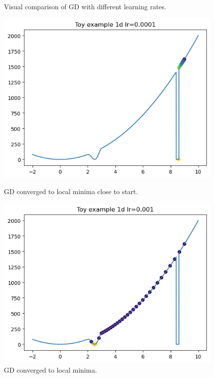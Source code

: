 \documentclass{article}
\theoremstyle{definition}
\begin{document}
\begin{figure}[!htb]
    \caption{Visual comparison of GD with different learning rates.}
      \includegraphics[width=\linewidth]{1d_example_min_near_start.png}
      \caption{GD converged to local minima close to start.}
    \endminipage\hfill
      \includegraphics[width=\linewidth]{1d_example_local_min.png}
      \caption{GD converged to local minima.}
    \endminipage\hfill

\end{figure}
\end{document}
